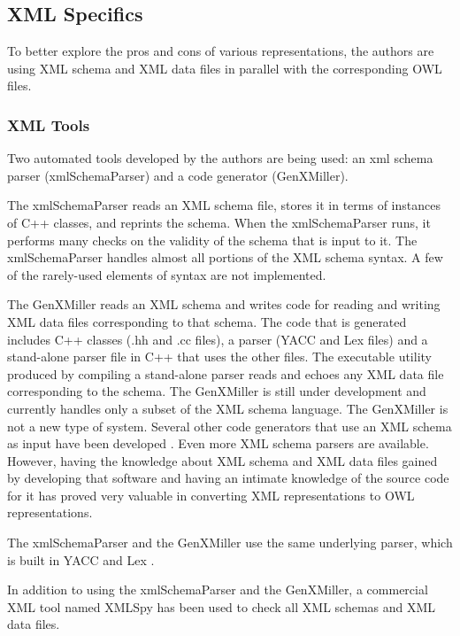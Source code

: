 \subsection{XML Specifics}
To better explore the pros and cons of various representations,
the authors are using XML schema and XML data files in parallel with the
corresponding OWL files.\\

\subsubsection{XML Tools}
Two automated tools developed by the authors are being used: an xml schema
parser (xmlSchemaParser) and a code generator (GenXMiller).  

The xmlSchemaParser reads an XML schema file, stores it in terms of
instances of C++ classes, and reprints the schema. When the xmlSchemaParser
runs, it performs many checks on the validity of the schema that is input
to it. The xmlSchemaParser handles almost all portions of the XML schema
syntax. A few of the rarely-used elements of syntax are not implemented.

The GenXMiller reads an XML schema and writes code for reading and writing
XML data files corresponding to that schema. The code that is generated
includes C++ classes (.hh and .cc files), a parser (YACC and Lex files) and
a stand-alone parser file in C++ that uses the other files.  The executable
utility produced by compiling a stand-alone parser reads and echoes any XML
data file corresponding to the schema. The GenXMiller is still under
development and currently handles only a subset of the XML schema language. 
The GenXMiller is not a
new type of system. Several other code generators that use an XML schema
as input have been developed \cite{XMLSchema1,ApacheXML}. 
Even more XML schema parsers are
available. However, having the knowledge about XML schema and XML data
files gained by developing that software and having an intimate knowledge
of the source code for it has proved very valuable in converting XML representations
to OWL representations.

The xmlSchemaParser and the GenXMiller use the same underlying parser,
which is built in YACC and Lex \cite{LexAndYACC}.

In addition to using the xmlSchemaParser and the GenXMiller, a commercial
XML tool named XMLSpy \cite{XMLSpyManual} has been used to check all XML
schemas and XML data files.\\

